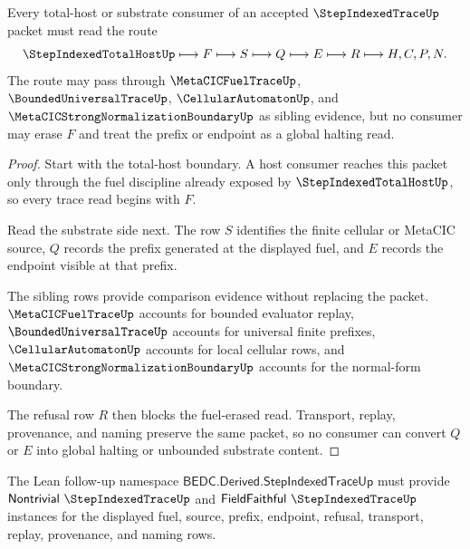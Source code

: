 \begin{theorem}
\label{thm:step-indexed-trace-total-host-handoff}
Every total-host or substrate consumer of an accepted $\StepIndexedTraceUp$ packet must read the route
$$
\StepIndexedTotalHostUp \longmapsto F \longmapsto S \longmapsto Q \longmapsto E \longmapsto R \longmapsto H,C,P,N .
$$
The route may pass through $\MetaCICFuelTraceUp$, $\BoundedUniversalTraceUp$, $\CellularAutomatonUp$, and $\MetaCICStrongNormalizationBoundaryUp$ as sibling evidence, but no consumer may erase $F$ and treat the prefix or endpoint as a global halting read.
\end{theorem}
\begin{proof}
Start with the total-host boundary. A host consumer reaches this packet only through the fuel discipline already exposed by $\StepIndexedTotalHostUp$, so every trace read begins with $F$.

Read the substrate side next. The row $S$ identifies the finite cellular or MetaCIC source, $Q$ records the prefix generated at the displayed fuel, and $E$ records the endpoint visible at that prefix.

The sibling rows provide comparison evidence without replacing the packet. $\MetaCICFuelTraceUp$ accounts for bounded evaluator replay, $\BoundedUniversalTraceUp$ accounts for universal finite prefixes, $\CellularAutomatonUp$ accounts for local cellular rows, and $\MetaCICStrongNormalizationBoundaryUp$ accounts for the normal-form boundary.

The refusal row $R$ then blocks the fuel-erased read. Transport, replay, provenance, and naming preserve the same packet, so no consumer can convert $Q$ or $E$ into global halting or unbounded substrate content.
\end{proof}



The Lean follow-up namespace $\mathsf{BEDC.Derived.StepIndexedTraceUp}$ must provide $\mathsf{Nontrivial}\ \StepIndexedTraceUp$ and $\mathsf{FieldFaithful}\ \StepIndexedTraceUp$ instances for the displayed fuel, source, prefix, endpoint, refusal, transport, replay, provenance, and naming rows.

